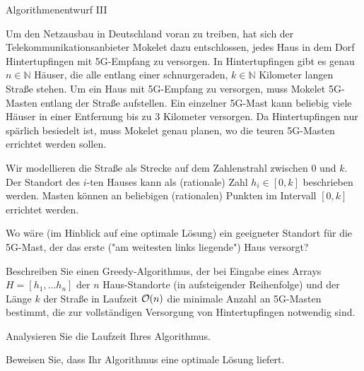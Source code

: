 \documentclass{exercisesheet}
\begin{document}
\begin{eexercises}{Algorithmenentwurf III}{
    Um den Netzausbau in Deutschland voran zu treiben, hat sich der Telekommunikationsanbieter Mokelet dazu entschlossen, jedes Haus in dem Dorf Hintertupfingen mit 5G-Empfang zu versorgen. In Hintertupfingen gibt es genau $n \in \mathbb{N}$ Häuser, die alle entlang einer schnurgeraden, $k \in \mathbb{N}$ Kilometer langen Straße stehen. Um ein Haus mit 5G-Empfang zu versorgen, muss Mokelet 5G-Masten entlang der Straße aufstellen. Ein einzelner 5G-Mast kann beliebig viele Häuser in einer Entfernung bis zu 3 Kilometer versorgen. Da Hintertupfingen nur spärlich besiedelt ist, muss Mokelet genau planen, wo die teuren 5G-Masten errichtet werden sollen.\par
    Wir modellieren die Straße als Strecke auf dem Zahlenstrahl zwischen 0 und $k$. Der Standort des $i$-ten Hauses kann als (rationale) Zahl $h_i \in [0, k]$ beschrieben werden. Masten können an beliebigen (rationalen) Punkten im Intervall $[0, k]$ errichtet werden.
  }
  \item Wo wäre (im Hinblick auf eine optimale Lösung) ein geeigneter Standort für die 5G-Mast, der das erste ("am weitesten links liegende") Haus versorgt?
  \item Beschreiben Sie einen Greedy-Algorithmus, der bei Eingabe eines Arrays $H = [h_1, \ldots h_n]$ der $n$ Haus-Standorte (in aufsteigender Reihenfolge) und der Länge $k$ der Straße in Laufzeit $\mathcal{O}(n)$ die minimale Anzahl an 5G-Masten bestimmt, die zur vollständigen Versorgung von Hintertupfingen notwendig sind.
  \item Analysieren Sie die Laufzeit Ihres Algorithmus.
  \item Beweisen Sie, dass Ihr Algorithmus eine optimale Lösung liefert.
\end{eexercises}
\end{document}
